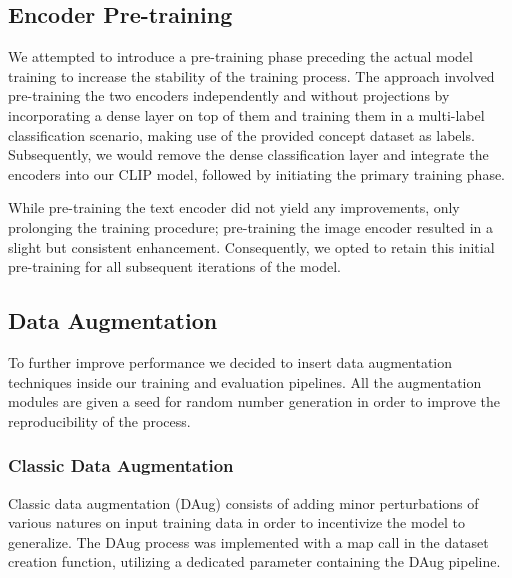 \documentclass[10pt,twocolumn,letterpaper]{article}
\begin{document}
\subsection{Encoder Pre-training}
We attempted to introduce a pre-training phase preceding the actual model training to increase the stability of the training process.
The approach involved pre-training the two encoders independently and without projections by incorporating a dense layer on top of them and training them in a multi-label classification scenario, making use of the provided concept dataset as labels. Subsequently, we would remove the dense classification layer and integrate the encoders into our CLIP model, followed by initiating the primary training phase.

While pre-training the text encoder did not yield any improvements, only prolonging the  training procedure; pre-training the image encoder resulted in a slight but consistent enhancement.
Consequently, we opted to retain this initial pre-training for all subsequent iterations of the model.

\subsection{Data Augmentation}
To further improve performance we decided to insert data augmentation techniques inside our training and evaluation pipelines.
All the augmentation modules are given a seed for random number generation in order to improve the reproducibility of the process.

\subsubsection{Classic Data Augmentation}
Classic data augmentation (DAug) consists of adding minor perturbations of various natures on input training data in order to incentivize the model to generalize.
The DAug process was implemented with a map call in the dataset creation function, utilizing a dedicated parameter containing the DAug pipeline.
\end{document}
